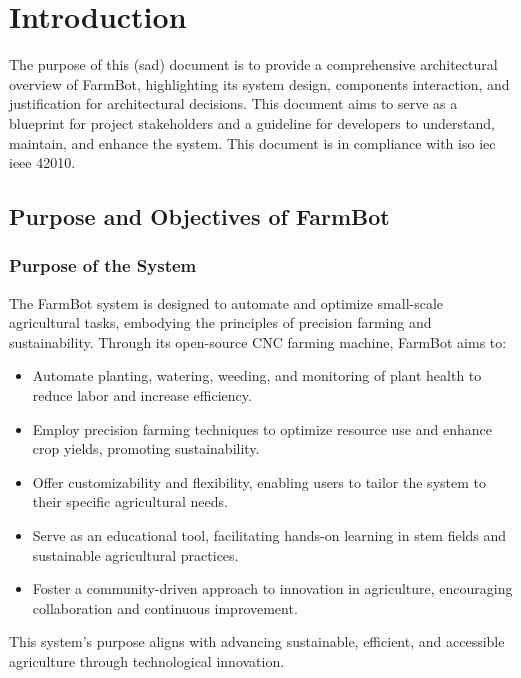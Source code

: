 
\chapter{Introduction} \label{introduction}
The purpose of this (\gls{sad}) document is to provide a comprehensive architectural overview of FarmBot, highlighting its system design, components interaction, and justification for architectural decisions. This document aims to serve as a blueprint for project stakeholders and a guideline for developers to understand, maintain, and enhance the system. This document is in compliance with \gls{iso} \gls{iec} \gls{ieee} 42010.
\cite{ieee29148}
\section{Purpose and Objectives of FarmBot}

\subsection{Purpose of the System}
The FarmBot system is designed to automate and optimize small-scale agricultural tasks, embodying the principles of precision farming and sustainability. Through its open-source CNC farming machine, FarmBot aims to:
\begin{itemize}
    \item Automate planting, watering, weeding, and monitoring of plant health to reduce labor and increase efficiency.
    \item Employ precision farming techniques to optimize resource use and enhance crop yields, promoting sustainability.
    \item Offer customizability and flexibility, enabling users to tailor the system to their specific agricultural needs.
    \item Serve as an educational tool, facilitating hands-on learning in \gls{stem} fields and sustainable agricultural practices.
    \item Foster a community-driven approach to innovation in agriculture, encouraging collaboration and continuous improvement.
\end{itemize}
This system’s purpose aligns with advancing sustainable, efficient, and accessible agriculture through technological innovation.

